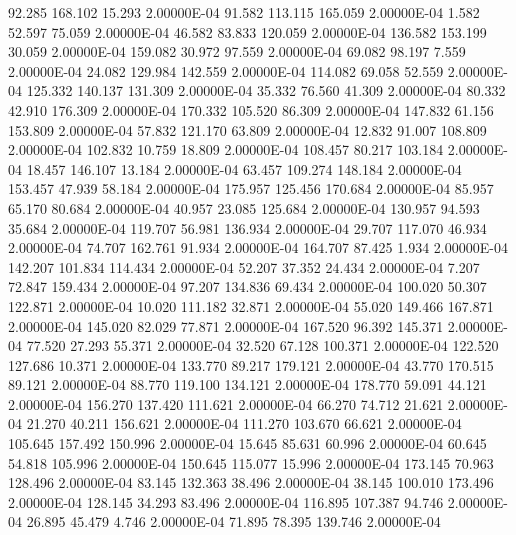     92.285   168.102    15.293  2.00000E-04
    91.582   113.115   165.059  2.00000E-04
     1.582    52.597    75.059  2.00000E-04
    46.582    83.833   120.059  2.00000E-04
   136.582   153.199    30.059  2.00000E-04
   159.082    30.972    97.559  2.00000E-04
    69.082    98.197     7.559  2.00000E-04
    24.082   129.984   142.559  2.00000E-04
   114.082    69.058    52.559  2.00000E-04
   125.332   140.137   131.309  2.00000E-04
    35.332    76.560    41.309  2.00000E-04
    80.332    42.910   176.309  2.00000E-04
   170.332   105.520    86.309  2.00000E-04
   147.832    61.156   153.809  2.00000E-04
    57.832   121.170    63.809  2.00000E-04
    12.832    91.007   108.809  2.00000E-04
   102.832    10.759    18.809  2.00000E-04
   108.457    80.217   103.184  2.00000E-04
    18.457   146.107    13.184  2.00000E-04
    63.457   109.274   148.184  2.00000E-04
   153.457    47.939    58.184  2.00000E-04
   175.957   125.456   170.684  2.00000E-04
    85.957    65.170    80.684  2.00000E-04
    40.957    23.085   125.684  2.00000E-04
   130.957    94.593    35.684  2.00000E-04
   119.707    56.981   136.934  2.00000E-04
    29.707   117.070    46.934  2.00000E-04
    74.707   162.761    91.934  2.00000E-04
   164.707    87.425     1.934  2.00000E-04
   142.207   101.834   114.434  2.00000E-04
    52.207    37.352    24.434  2.00000E-04
     7.207    72.847   159.434  2.00000E-04
    97.207   134.836    69.434  2.00000E-04
   100.020    50.307   122.871  2.00000E-04
    10.020   111.182    32.871  2.00000E-04
    55.020   149.466   167.871  2.00000E-04
   145.020    82.029    77.871  2.00000E-04
   167.520    96.392   145.371  2.00000E-04
    77.520    27.293    55.371  2.00000E-04
    32.520    67.128   100.371  2.00000E-04
   122.520   127.686    10.371  2.00000E-04
   133.770    89.217   179.121  2.00000E-04
    43.770   170.515    89.121  2.00000E-04
    88.770   119.100   134.121  2.00000E-04
   178.770    59.091    44.121  2.00000E-04
   156.270   137.420   111.621  2.00000E-04
    66.270    74.712    21.621  2.00000E-04
    21.270    40.211   156.621  2.00000E-04
   111.270   103.670    66.621  2.00000E-04
   105.645   157.492   150.996  2.00000E-04
    15.645    85.631    60.996  2.00000E-04
    60.645    54.818   105.996  2.00000E-04
   150.645   115.077    15.996  2.00000E-04
   173.145    70.963   128.496  2.00000E-04
    83.145   132.363    38.496  2.00000E-04
    38.145   100.010   173.496  2.00000E-04
   128.145    34.293    83.496  2.00000E-04
   116.895   107.387    94.746  2.00000E-04
    26.895    45.479     4.746  2.00000E-04
    71.895    78.395   139.746  2.00000E-04
